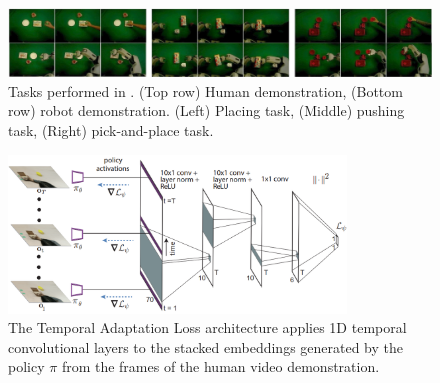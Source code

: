 \begin{figure}[t]
    \centering
    \includegraphics[width=\textwidth]{figures/images/daml/tasks.jpg}
    \caption{Tasks performed in \cite{yu2018daml}. (Top row) Human demonstration, (Bottom row) robot demonstration. (Left) Placing task, (Middle) pushing task, (Right) pick-and-place task.}
    \label{fig:daml_tasks}
\end{figure}

\begin{figure}[t]
    \centering
    \includegraphics[width=0.8\textwidth]{figures/images/daml/daml_temporal_adaptation_loss.png}
    \caption{The Temporal Adaptation Loss architecture applies 1D temporal convolutional layers to the stacked embeddings generated by the policy $\pi$ from the frames of the human video demonstration.}
    \label{fig:daml_temporal_adaptation_loss}
\end{figure}